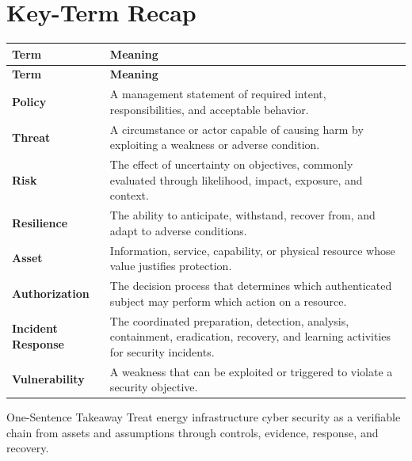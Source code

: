 \documentclass[11pt,letterpaper]{article}
\begin{document}
\section*{Key-Term Recap}
\begin{longtable}{>{\raggedright\arraybackslash}p{}>{\raggedright\arraybackslash}p{}}
\toprule\rowcolor{Navy}\color{white}\textbf{Term} & \color{white}\textbf{Meaning}\\\midrule
\endfirsthead
\toprule\rowcolor{Navy}\color{white}\textbf{Term} & \color{white}\textbf{Meaning}\\\midrule
\endhead
\textbf{Policy} & A management statement of required intent, responsibilities, and acceptable behavior. \\\midrule
\textbf{Threat} & A circumstance or actor capable of causing harm by exploiting a weakness or adverse condition. \\\midrule
\textbf{Risk} & The effect of uncertainty on objectives, commonly evaluated through likelihood, impact, exposure, and context. \\\midrule
\textbf{Resilience} & The ability to anticipate, withstand, recover from, and adapt to adverse conditions. \\\midrule
\textbf{Asset} & Information, service, capability, or physical resource whose value justifies protection. \\\midrule
\textbf{Authorization} & The decision process that determines which authenticated subject may perform which action on a resource. \\\midrule
\textbf{Incident Response} & The coordinated preparation, detection, analysis, containment, eradication, recovery, and learning activities for security incidents. \\\midrule
\textbf{Vulnerability} & A weakness that can be exploited or triggered to violate a security objective. \\\midrule
\bottomrule
\end{longtable}
\begin{CornellExamBox}{One-Sentence Takeaway}
Treat energy infrastructure cyber security as a verifiable chain from assets and assumptions through controls, evidence, response, and recovery.
\end{CornellExamBox}
\end{document}
